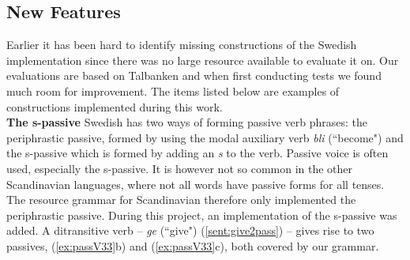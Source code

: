 \documentclass[runningheads,a4paper]{llncs}
\begin{document}
\subsection{New Features}

%
%
%
%
%
Earlier it has been hard to identify missing constructions of the Swedish
implementation since there was no large resource available to evaluate it on.
Our evaluations are based on Talbanken and when first conducting tests
 we found much room for improvement. The items listed below are examples
 of constructions implemented during this work.\\

\noindent\textbf{The s-passive}
Swedish has two ways of forming passive verb phrases: the 
periphrastic passive, formed by using the modal auxiliary verb \emph{bli}
(``become")
and the s-passive which is formed by adding an \emph{s} to the verb. 
Passive voice is often used, especially the
s-passive. %
It is however not so common in the other Scandinavian languages, 
where not all words have passive forms for all tenses. The resource grammar for
Scandinavian therefore only implemented the periphrastic passive.
During this project, an implementation of   the s-passive was added.
A ditransitive verb -- \emph{ge} (``give") (\ref{sent:give2pass}) -- gives rise to two
passives, (\ref{ex:passV33}b) and (\ref{ex:passV33}c), both covered by our grammar.
\label{ex:passV33}
\end{document}
